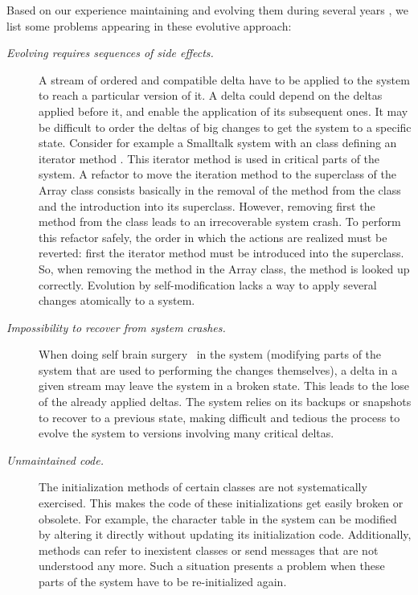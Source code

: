 Based on our experience maintaining and evolving them during several years \cite{Denk07a}, we list some problems appearing in these evolutive approach: 
\begin{description}

\item[\emph{Evolving requires sequences of side effects.}] A stream of ordered and compatible delta have to be applied to the system to reach a particular version of it. A delta could depend on the deltas applied before it, and enable the application of its subsequent ones. It may be difficult to order the deltas of big changes to get the system to a specific state. 
Consider for example a Smalltalk system with an  class defining an iterator method .
This iterator method is used in critical parts of the system.
A refactor to move the iteration method to the superclass of the Array class consists basically in the removal of the method from the  class and the introduction into its superclass.
However, removing first the method from the  class leads to an irrecoverable system crash.
To perform this refactor safely, the order in which the actions are realized must be reverted: first the iterator method must be introduced into the superclass.
So, when removing the method in the Array class, the method is looked up correctly.
Evolution by self-modification lacks a way to apply several changes atomically to a system.

\item[\em{Impossibility to recover from system crashes.}] When doing self brain surgery~\cite{Casa09a} in the system (modifying parts of the system that are used to performing the changes themselves), a delta in a given stream may leave the system in a broken state. This leads to the lose of the already applied deltas. The system relies on its backups or snapshots to recover to a previous state, making difficult and tedious the process to evolve the system to versions involving many critical deltas. 

\item[\emph{Unmaintained code.}] The initialization methods of certain classes are not systematically exercised. This makes the code of these initializations get easily broken or obsolete. For example, the character table in the system can be modified by altering it directly without updating its initialization code. Additionally, methods can refer to inexistent classes or send messages that are not understood any more. Such a situation presents a problem when these parts of the system have to be re-initialized again.


\end{description}
